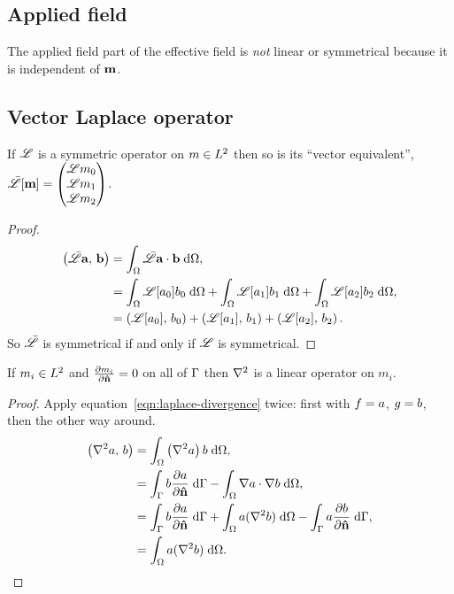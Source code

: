 \subsection{Applied field}

The applied field part of the effective field is \emph{not} linear or symmetrical because it is independent of $\boldsymbol{\mathrm{m}}$.

\subsection{Vector Laplace operator}

\begin{theorem}
  If $\mathscr{L}$ is a symmetric operator on $m \in {L^2}$ then so is its ``vector equivalent'', $\bar{\mathscr{L}}[\boldsymbol{\mathrm{m}}] = \begin{pmatrix} \mathscr{L} m_0 \\ \mathscr{L} m_1 \\ \mathscr{L} m_2 \end{pmatrix}$.
\end{theorem}

\begin{proof}
  \begin{equation}
    \begin{aligned}
      \left(\bar{\mathscr{L}}{\boldsymbol{\mathrm{a}}},\, {\boldsymbol{\mathrm{b}}} \right) &= {\int_{\Omega} { \bar{\mathscr{L}} {\boldsymbol{\mathrm{a}}} \cdot {\boldsymbol{\mathrm{b}}}} {\; \mathrm{{d}}} {\Omega}}, \\
      &= {\int_{\Omega} {\mathscr{L}[a_0] b_0} {\; \mathrm{{d}}} {\Omega}} + {\int_{\Omega} {\mathscr{L}[a_1] b_1} {\; \mathrm{{d}}} {\Omega}} + {\int_{\Omega} {\mathscr{L}[a_2] b_2} {\; \mathrm{{d}}} {\Omega}}, \\
      & = \left(\mathscr{L}[a_0],\, b_0 \right) + \left(\mathscr{L}[a_1],\, b_1 \right) + \left(\mathscr{L}[a_2],\, b_2 \right).
    \end{aligned}
  \end{equation}
  So $\bar{\mathscr{L}}$ is symmetrical if and only if $\mathscr{L}$ is symmetrical.
\end{proof}

\begin{theorem}
  If $m_i \in {L^2}$ and $\frac{\partial m_i}{\partial \boldsymbol{\mathrm{\hat{n}}}} = 0$ on all of ${\Gamma}$ then $\nabla^2$ is a linear operator on $m_i$.
\end{theorem}
\begin{proof}
  Apply equation~\cref{eqn:laplace-divergence} twice: first with $f = a$, $g = b$, then the other way around.
  \begin{equation}
    \begin{aligned}
      \label{eq:93}
      \ip{\lap a}{b} &= \intd{\left(\lap a \right) b}, \\
      &= \intb{b \ddn{a}} - \intd{\grad a \cdot \grad b}, \\
      &= \intb{b \ddn{a}} + \intd{a (\lap b)} - \intb{a \ddn{b}}, \\
      &= \intd{a (\lap b)}.
    \end{aligned}
  \end{equation}
\end{proof}

